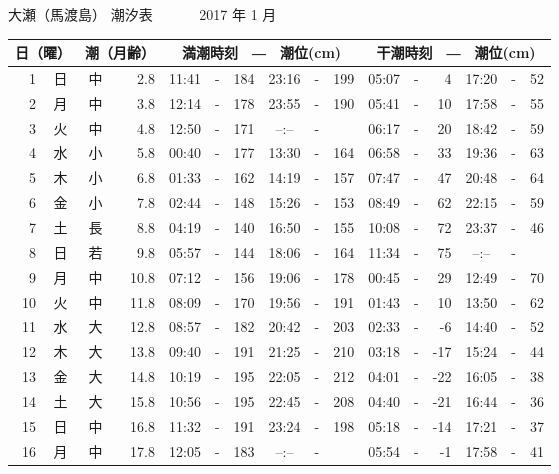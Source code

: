 \documentclass[12pt.a4j]{jsarticle}
\begin{document}
\pagestyle{empty}
 \begin{center}
 {\LARGE 大瀬（馬渡島）  潮汐表　　　}
 {\large 2017 年  1 月}\\
 \begin{table}[ht]
    \begin{tabular}{|rc|cr|ccrccr|ccrccr|}
    \hline
    \multicolumn{2}{|c|}{日（曜）} & \multicolumn{2}{c|}{潮（月齢）} & \multicolumn{6}{c|}{満潮時刻　―　潮位(cm)} & \multicolumn{6}{c|}{干潮時刻　―　潮位(cm)} \\
 \hline
 1 & 日 & 中 &  2.8 &  11:41 &-& 184  &  23:16 &-& 199  &   05:07 &-&   4  &   17:20 &-&  52  \\
 2 & 月 & 中 &  3.8 &  12:14 &-& 178  &  23:55 &-& 190  &   05:41 &-&  10  &   17:58 &-&  55  \\
 3 & 火 & 中 &  4.8 &  12:50 &-& 171  &  --:-- &-&     &   06:17 &-&  20  &   18:42 &-&  59  \\
 4 & 水 & 小 &  5.8 &  00:40 &-& 177  &  13:30 &-& 164  &   06:58 &-&  33  &   19:36 &-&  63  \\
 5 & 木 & 小 &  6.8 &  01:33 &-& 162  &  14:19 &-& 157  &   07:47 &-&  47  &   20:48 &-&  64  \\
 6 & 金 & 小 &  7.8 &  02:44 &-& 148  &  15:26 &-& 153  &   08:49 &-&  62  &   22:15 &-&  59  \\
 7 & 土 & 長 &  8.8 &  04:19 &-& 140  &  16:50 &-& 155  &   10:08 &-&  72  &   23:37 &-&  46  \\
 8 & 日 & 若 &  9.8 &  05:57 &-& 144  &  18:06 &-& 164  &   11:34 &-&  75  &   --:-- &-&     \\
 9 & 月 & 中 & 10.8 &  07:12 &-& 156  &  19:06 &-& 178  &   00:45 &-&  29  &   12:49 &-&  70  \\
10 & 火 & 中 & 11.8 &  08:09 &-& 170  &  19:56 &-& 191  &   01:43 &-&  10  &   13:50 &-&  62  \\
11 & 水 & 大 & 12.8 &  08:57 &-& 182  &  20:42 &-& 203  &   02:33 &-&  -6  &   14:40 &-&  52  \\
12 & 木 & 大 & 13.8 &  09:40 &-& 191  &  21:25 &-& 210  &   03:18 &-& -17  &   15:24 &-&  44  \\
13 & 金 & 大 & 14.8 &  10:19 &-& 195  &  22:05 &-& 212  &   04:01 &-& -22  &   16:05 &-&  38  \\
14 & 土 & 大 & 15.8 &  10:56 &-& 195  &  22:45 &-& 208  &   04:40 &-& -21  &   16:44 &-&  36  \\
15 & 日 & 中 & 16.8 &  11:32 &-& 191  &  23:24 &-& 198  &   05:18 &-& -14  &   17:21 &-&  37  \\
16 & 月 & 中 & 17.8 &  12:05 &-& 183  &  --:-- &-&     &   05:54 &-&  -1  &   17:58 &-&  41  \\

\end{tabular}
\end{table}
\end{center}
\end{document}
